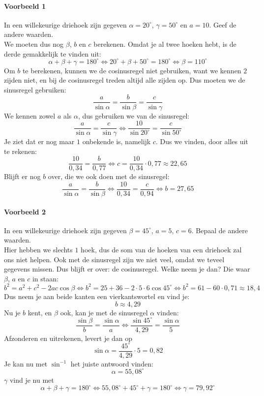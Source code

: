 \documentclass[a4paper,12pt]{article}
\begin{document}
\paragraph{Voorbeeld 1} In een willekeurige driehoek zijn gegeven $\alpha=20^\circ$, $\gamma = 50^\circ$ en $a=10$. Geef de andere waarden.\\
We moeten dus nog $\beta$, $b$ en $c$ berekenen. Omdat je al twee hoeken hebt, is de derde gemakkelijk te vinden uit:
\[\alpha+\beta+\gamma=180^\circ\Leftrightarrow 20^\circ + \beta + 50^\circ=180^\circ \Leftrightarrow \beta = 110^\circ\]
Om $b$ te berekenen, kunnen we de cosinusregel niet gebruiken, want we kennen $2$ zijden niet, en bij de cosinusregel treden altijd alle zijden op. Dus moeten we de sinusregel gebruiken:
\[\frac{a}{\sin \alpha} = \frac{b}{\sin \beta} = \frac{c}{\sin \gamma}\]
We kennen zowel $a$ als $\alpha$, dus gebruiken we van de sinusregel:
\[\frac{a}{\sin \alpha} = \frac{c}{\sin \gamma}\Leftrightarrow \frac{10}{\sin 20^\circ}=\frac{c}{\sin 50^\circ}\]
Je ziet dat er nog maar $1$ onbekende is, namelijk $c$.  Dus we vinden, door alles uit te rekenen:
\[\frac{10}{0,34}=\frac{b}{0,77}\Leftrightarrow c= \frac{10}{0,34}\cdot 0,77 \approx 22,65\]
Blijft er nog $b$ over, die we ook doen met de sinusregel:
\[\frac{a}{\sin \alpha}=\frac{b}{\sin \beta}\Leftrightarrow \frac{10}{0,34}=\frac{c}{0,94}\Leftrightarrow b= 27,65\]

\paragraph{Voorbeeld 2} In een willekeurige driehoek zijn gegeven $\beta = 45^\circ$, $a = 5$, $c=6$. Bepaal de andere waarden.\\
Hier hebben we slechts $1$ hoek, dus de som van de hoeken van een driehoek zal ons niet helpen. Ook met de sinusregel zijn we niet veel, omdat we teveel gegevens missen. Dus blijft er over: de cosinusregel. Welke neem je dan? Die waar $\beta$, $a$ en $c$ in staan:
\[b^2=a^2+c^2-2ac\cos\beta \Leftrightarrow b^2 = 25+36-2\cdot5\cdot 6\cos 45^\circ \Leftrightarrow b^2 = 61-60 \cdot 0,71 \approx 18,4\]
Dus neem je aan beide kanten een vierkantswortel en vind je:
\[b \approx 4,29\]
Nu je $b$ kent, en $\beta$ ook, kan je met de sinusregel $\alpha$ vinden:
\[\frac{\sin \beta}{b}=\frac{\sin \alpha}{a}\Leftrightarrow \frac{\sin 45^\circ}{4,29}=\frac{\sin \alpha}{5}\]
Afzonderen en uitrekenen, levert je dan op
\[\sin \alpha = \frac{45^\circ}{4,29}\cdot 5 = 0,82\]
Je kan nu met $\sin^{-1}$ het juiste antwoord vinden:
\[\alpha=55,08^\circ\]
$\gamma$ vind je nu met
\[\alpha+\beta+\gamma=180^\circ\Leftrightarrow 55,08^\circ + 45^\circ + \gamma = 180^\circ \Leftrightarrow \gamma = 79,92^\circ\]
\end{document}
